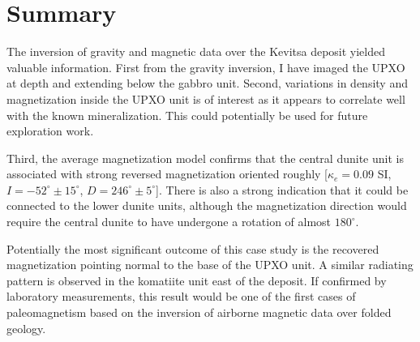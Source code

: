 \section{Summary}
The inversion of gravity and magnetic data over the Kevitsa deposit yielded valuable information.
First from the gravity inversion, I have imaged the UPXO at depth and extending below the gabbro unit.
Second, variations in density and magnetization inside the UPXO unit is of interest as it appears to correlate well with the known mineralization. This could potentially be used for future exploration work.

Third, the average magnetization model confirms that the central dunite unit is associated with strong reversed magnetization oriented roughly [$\kappa_{e} = 0.09$ SI, $I=-52^\circ \pm 15^\circ$, $D=246^\circ \pm 5^\circ$].
There is also a strong indication that it could be connected to the lower dunite units, although the magnetization direction would require the central dunite to have undergone a rotation of almost $180^\circ$.

Potentially the most significant outcome of this case study is the recovered magnetization pointing normal to the base of the UPXO unit. A similar radiating pattern is observed in the komatiite unit east of the deposit. If confirmed by laboratory measurements, this result would be one of the first cases of paleomagnetism based on the inversion of airborne magnetic data over folded geology.


\endinput

